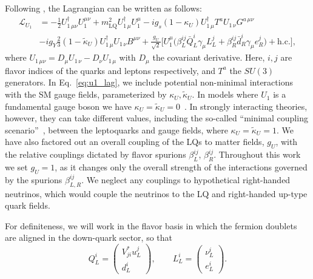 \documentclass[a4paper,11pt]{article}
\begin{document}
Following \cite{Baker:2019sli}, the Lagrangian can be written as follows: 
\begin{align}\label{eq:u1_lag}
\mathcal{L}_{U_1} & =  
-\frac{1}{2} U_{1\,\mu\nu}^{\dagger} U_{1}^{\mu\nu} 
+ m_{\textrm{LQ}}^2 U_{1\,\mu}^{\dagger} U_1^{\mu}
-i g_s (1 - \kappa_U) U_{1\,\mu}^{\dagger} T^a U_{1\, \nu} G^{a\, \mu\nu} \nonumber \\ 
&
- i g_Y \frac{2}{3}(1 - \tilde{\kappa}_U) U_{1\,\mu}^{\dagger} U_{1\, \nu} B^{\mu\nu} 
+ \frac{g_U}{\sqrt{2}} \bigg[ 
U_1^{\mu}\big( 
\beta^{ij}_L \bar{Q}_L^i \gamma_{\mu} L_L^j 
+ \beta^{ij}_R \bar{d}_R^i \gamma_{\mu} e_R^j 
\big) + \textrm{h.c.}
\bigg] ,
\end{align}
where $U_{1\,\mu\nu} = D_{\mu}U_{1\,\nu} - D_{\nu}U_{1\,\mu}$ with $D_{\mu}$ the covariant derivative.
Here, $i, j$ are flavor indices of the quarks and leptons respectively, and $T^a$ the $SU(3)$ generators.
In Eq.~\eqref{eq:u1_lag}, we include potential non-minimal interactions with the SM gauge fields, parameterized by $\kappa_U, \tilde{\kappa}_U$. 
In models where $U_1$ is a fundamental gauge boson we have
$\kappa_U = \tilde{\kappa}_U = 0$~\cite{Rizzo:1996ry}.
In strongly interacting theories, however, they can take different values, including the so-called ``minimal coupling scenario''~\cite{CiezaMontalvo:1992bs, Blumlein:1992ej}, between the leptoquarks and gauge fields, where $\kappa_{U} = \tilde{\kappa}_U = 1$.
We have also factored out an overall coupling of the LQs to matter fields, $g_U$, with the relative couplings dictated by flavor spurions $\beta_L^{ij}$, $\beta_R^{ij}$. 
Throughout this work we set $g_U=1$, as it changes only the overall strength of the interactions governed by the spurions $\beta_{L,R}^{ij}$.
We neglect any couplings to hypothetical right-handed neutrinos, which would couple the neutrinos to the LQ and right-handed up-type quark fields.

For definiteness, we will work in the flavor basis in which the fermion doublets are aligned in the down-quark sector, so that
\begin{equation}
Q_L^i = \begin{pmatrix} V_{ji}^* u_L^j \\ d_L^i \end{pmatrix}, 
\qquad
L_L^i = \begin{pmatrix} \nu_L^i \\ e_L^i \end{pmatrix}.
\end{equation}
\end{document}
